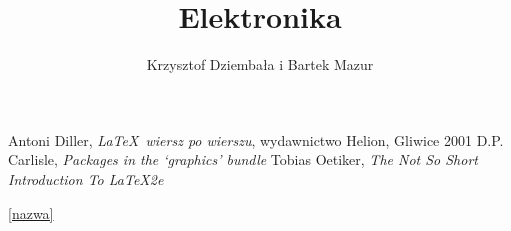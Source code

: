 \begin{thebibliography}{3}
 Antoni Diller, \textit{\LaTeX\ wiersz po wierszu},
wydawnictwo Helion, Gliwice 2001
 D.P. Carlisle, \textit{Packages in the ‘graphics’
bundle}
 Tobias Oetiker, \textit{The Not So Short Introduction
To \LaTeX2e}
\end{thebibliography}

\label{nazwa}
\ref {nazwa}


\documentclass[a4paper,10pt]{book}
\usepackage{polski}
\usepackage[utf8]{inputenc}
\usepackage{listings}
\setlength{\parindent}{5mm}

\title{Elektronika}
\author{Krzysztof Dziembała i Bartek Mazur}



\maketitle


\tableofcontents 
\section{Programowanie Arduino}
 
 \\Arduino aby działać musi zostać zaprogramowane. Programuje się je w języku Arduino, opartym na językach C/C++.
\\*Program jest kompilowany, czyli przetwarzany na język zrozumiały dla urządzenia, oraz na nie wgrywany za pomocą
Arduino IDE.


\subsection {Składnia języka używanego w środowisku C++}
Największą różnicą jest struktura, składnia praktycznie się nie różni
W tym rozdziale zajmiemy się wytłumaczeniem, jak programować w Arduino.
  Język Arduino można podzielić na 3 główne części:
  \begin{enumerate}
	\item Struktura
	\item Zmienne
	\item Funkcje
\end{enumerate}
